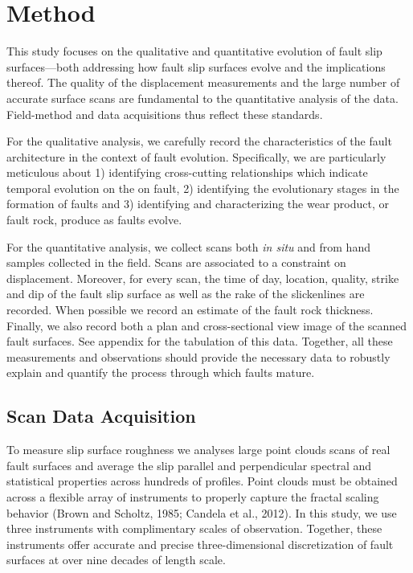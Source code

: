 \documentclass[12pt,a4paper]{article}
\begin{document}
\section{Method}

This study focuses on the qualitative and quantitative evolution of fault slip surfaces—both addressing how fault slip surfaces evolve and the implications thereof. The quality of the displacement measurements and the large number of accurate surface scans are fundamental to the quantitative analysis of the data. Field-method and data acquisitions thus reflect these standards. 

For the qualitative analysis, we carefully record the characteristics of the fault architecture in the context of fault evolution. Specifically, we are particularly meticulous about 1) identifying cross-cutting relationships which indicate temporal evolution on the on fault, 2) identifying the evolutionary stages in the formation of faults and 3) identifying and characterizing the wear product, or fault rock, produce as faults evolve. 

For the quantitative analysis, we collect scans both \textit{in situ} and from hand samples collected in the field. Scans are associated to a constraint on displacement. Moreover, for every scan, the time of day, location, quality, strike and dip of the fault slip surface as well as the rake of the slickenlines are recorded. When possible we record an estimate of the fault rock thickness. Finally, we also record both a plan and cross-sectional view image of the scanned fault surfaces.  See appendix for the tabulation of this data. Together, all these measurements and observations should provide the necessary data to robustly explain and quantify the process through which faults mature.

	\subsection{Scan Data Acquisition}

To measure slip surface roughness we analyses large point clouds scans of real fault surfaces and average the slip parallel and perpendicular spectral and statistical properties across hundreds of profiles. Point clouds must be obtained across a flexible array of instruments to properly capture the fractal scaling behavior (Brown and Scholtz, 1985; Candela et al., 2012). In this study, we use three instruments with complimentary scales of observation.  Together, these instruments offer accurate and precise three-dimensional discretization of fault surfaces at over nine decades of length scale.
\end{document}

